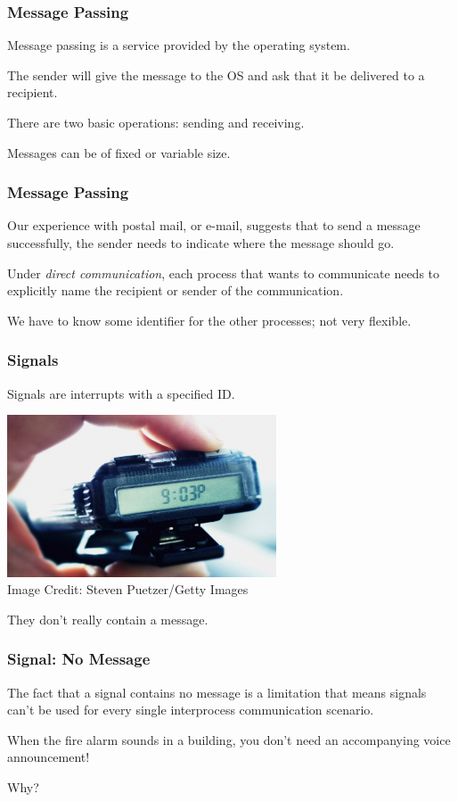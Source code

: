 \begin{frame}
	\frametitle{Message Passing}

	Message passing is a service provided by the operating system.

	The sender will give the message to the OS and ask that it be delivered to a recipient.

	There are two basic operations: sending and receiving.

	Messages can be of fixed or variable size.


\end{frame}

\begin{frame}
	\frametitle{Message Passing}

	Our experience with postal mail, or e-mail, suggests that to send a message successfully, the sender needs to indicate where the message should go.

	Under \textit{direct communication}, each process that wants to communicate needs to explicitly name the recipient or sender of the communication.

	We have to know some identifier for the other processes; not very flexible.
\end{frame}

\begin{frame}
	\frametitle{Signals}

	Signals are interrupts with a specified ID.

	\begin{center}
		\includegraphics[width=0.6\textwidth]{images/pager.jpg}\\
		Image Credit:  Steven Puetzer/Getty Images
	\end{center}

	They don't really contain a message.

\end{frame}


\begin{frame}
	\frametitle{Signal: No Message}

	The fact that a signal contains no message is a limitation that means signals can't be used for every single interprocess communication scenario.

	When the fire alarm sounds in a building, you don't need an accompanying voice announcement!

	Why?

\end{frame}



